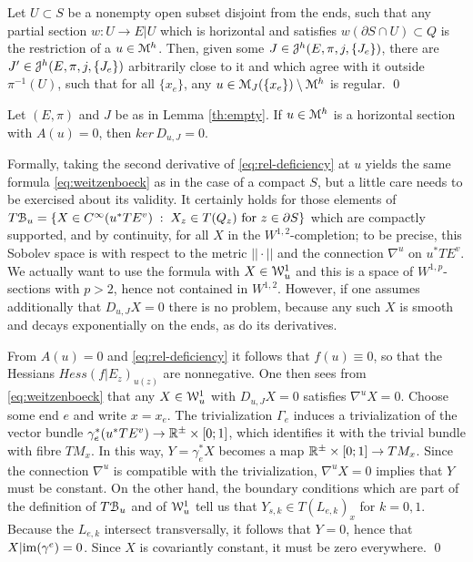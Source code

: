 \documentclass[10pt,letterpaper]{article}
\begin{document}
\begin{lemma} \label{th:relative-h-transversality}
Let $U \subset S$ be a nonempty open subset disjoint from the ends, such that
any partial section $w: U \rightarrow E|U$ which is horizontal and satisfies
$w(\partial S \cap U) \subset Q$ is the restriction of a $u \in \mathcal{M}^h$. Then,
given some $J \in \mathcal{J}^h(E,\pi,j,\{J_e\})$, there are $J' \in
\mathcal{J}^h(E,\pi,j,\{J_e\})$ arbitrarily close to it and which agree with it outside
$\pi^{-1}(U)$, such that for all $\{x_e\}$, any $u \in \mathcal{M}_J(\{x_e\}) \setminus
\mathcal{M}^h$ is regular. \qed
\end{lemma} \vspace{\parskip}

\begin{lemma} \label{th:negative-index}
Let $(E,\pi)$ and $J$ be as in Lemma \ref{th:empty}. If $u \in \mathcal{M}^h$ is a
horizontal section with $A(u) = 0$, then $ker \, D_{u,J} = 0$.
\end{lemma}

\proof Formally, taking the second derivative of \eqref{eq:rel-deficiency} at
$u$ yields the same formula \eqref{eq:weitzenboeck} as in the case of a compact
$S$, but a little care needs to be exercised about its validity. It certainly
holds for those elements of $T\mathcal{B}_u = \{ X \in C^\infty(u^*TE^v) \; : \; X_z
\in T(Q_z) \text{ for } z \in \partial S\}$ which are compactly supported, and
by continuity, for all $X$ in the $W^{1,2}$-completion; to be precise, this
Sobolev space is with respect to the metric $||\cdot||$ and the connection
$\nabla^u$ on $u^*TE^v$. We actually want to use the formula with $X \in
\mathcal{W}^1_u$ and this is a space of $W^{1,p}$-sections with $p>2$, hence not
contained in $W^{1,2}$. However, if one assumes additionally that $D_{u,J}X =
0$ there is no problem, because any such $X$ is smooth and decays exponentially
on the ends, as do its derivatives.

From $A(u) = 0$ and \eqref{eq:rel-deficiency} it follows that $f(u) \equiv 0$,
so that the Hessians $Hess(f|E_z)_{u(z)}$ are nonnegative. One then sees from
\eqref{eq:weitzenboeck} that any $X \in \mathcal{W}^1_u$ with $D_{u,J}X = 0$ satisfies
$\nabla^uX = 0$. Choose some end $e$ and write $x = x_e$. The trivialization
$\Gamma_e$ induces a trivialization of the vector bundle $\gamma_e^*(u^*TE^v)
\rightarrow \mathbb{R}^{\pm} \times [0;1]$, which identifies it with the trivial bundle
with fibre $TM_x$. In this way, $Y = \gamma_e^*X$ becomes a map $\mathbb{R}^{\pm}
\times [0;1] \rightarrow TM_x$. Since the connection $\nabla^u$ is compatible
with the trivialization, $\nabla^uX = 0$ implies that $Y$ must be constant. On
the other hand, the boundary conditions which are part of the definition of
$T\mathcal{B}_u$ and of $\mathcal{W}^1_u$ tell us that $Y_{s,k} \in T(L_{e,k})_x$ for $k =
0,1$. Because the $L_{e,k}$ intersect transversally, it follows that $Y = 0$,
hence that $X | \mathrm{im}(\gamma^e) = 0$. Since $X$ is covariantly constant, it must
be zero everywhere. \qed
\end{document}
